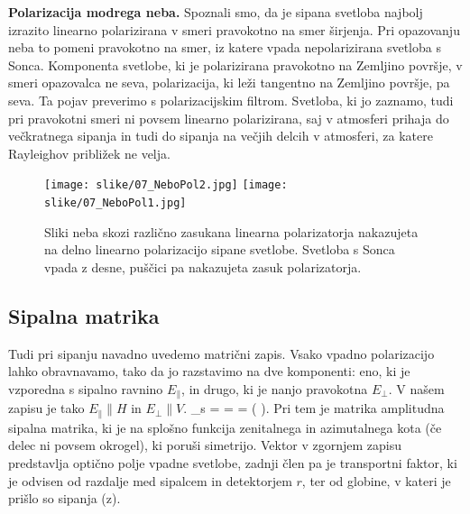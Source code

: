\begin{example}{\bf Polarizacija modrega neba.}
Spoznali smo, da je sipana svetloba najbolj izrazito linearno polarizirana v smeri pravokotno na smer 
širjenja. Pri opazovanju neba to pomeni pravokotno na smer, iz katere vpada nepolarizirana 
svetloba s Sonca. Komponenta svetlobe, ki je polarizirana pravokotno na Zemljino površje, 
v smeri opazovalca ne seva, polarizacija, ki leži tangentno na Zemljino površje, pa seva. Ta
pojav preverimo s polarizacijskim filtrom. Svetloba, ki jo zaznamo, tudi pri pravokotni smeri
ni povsem linearno polarizirana, saj v atmosferi prihaja do večkratnega sipanja in tudi do 
sipanja na večjih delcih v atmosferi, za katere Rayleighov približek ne velja.
\begin{figure}[!h]
\centering
\texttt{[image: slike/07\_NeboPol2.jpg]}\hfill
\texttt{[image: slike/07\_NeboPol1.jpg]}
\caption{Sliki neba skozi različno zasukana linearna polarizatorja nakazujeta na delno
linearno polarizacijo sipane svetlobe. Svetloba s Sonca vpada z desne, puščici pa nakazujeta
zasuk polarizatorja.}
\label{fig:07_NeboPol}
\end{figure}

\end{example}

\subsection*{Sipalna matrika}
Tudi pri sipanju navadno uvedemo matrični zapis. Vsako vpadno polarizacijo lahko obravnavamo, tako
da jo razstavimo na dve komponenti: eno, ki je vzporedna s sipalno ravnino $E_\parallel$, in drugo, ki 
je nanjo pravokotna $E_\perp$. V našem zapisu je tako $E_\parallel \parallel H$ in
$E_\perp \parallel V$. 
\beq
{}_s = 
\left[\begin{array}{c}
E_{s,H}\\
E_{s,V}\\
\end{array}\right]
=  = 
\left[\begin{array}{cc}
S_2 & S_3 \\
S_4 & S_1\\
\end{array}\right] 
\left(
\right)\!\!.
\label{eq:07_14}
\eeq
Pri tem je matrika amplitudna sipalna matrika, ki je na splošno funkcija zenitalnega
in azimutalnega kota (če delec ni povsem okrogel), ki poruši simetrijo. Vektor v zgornjem
zapisu predstavlja optično polje vpadne svetlobe, zadnji člen pa je transportni faktor,
ki je odvisen od razdalje med sipalcem in detektorjem $r$, ter od globine, v kateri
je prišlo so sipanja (z).

